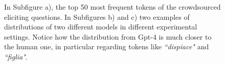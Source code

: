 \begin{figure}[!htbp]
    \caption{In Subfigure a), the top 50 most frequent tokens of the crowdsourced eliciting questions. In Subfigures b) and c) two examples of distributions of two different models in different experimental settings. Notice how the distribution from Gpt-4 is much closer to the human one, in particular regarding tokens like \emph{``dispiace"} and \emph{``figlia"}. %
    }
    \label{fig:persona-narrative-elicitation-comparison-distribution}
\end{figure}

